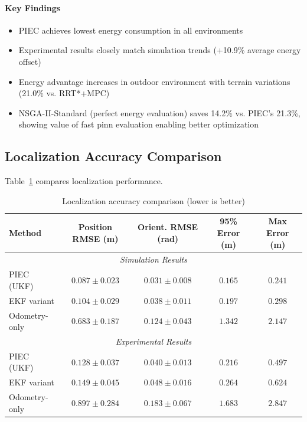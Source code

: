 
\paragraph{Key Findings}
\begin{itemize}
    \item PIEC achieves lowest energy consumption in all environments
    \item Experimental results closely match simulation trends (+10.9\% average energy offset)
    \item Energy advantage increases in outdoor environment with terrain variations (21.0\% vs. RRT*+MPC)
    \item NSGA-II-Standard (perfect energy evaluation) saves 14.2\% vs. PIEC's 21.3\%, showing value of fast \acrshort{pinn} evaluation enabling better optimization
\end{itemize}

\subsection{Localization Accuracy Comparison}

Table~\ref{tab:comparison_localization} compares localization performance.

\begin{table}[htbp]
\centering
\caption{Localization accuracy comparison (lower is better)}
\label{tab:comparison_localization}
\begin{tabular}{lcccc}
\toprule
\textbf{Method} & \textbf{Position RMSE (m)} & \textbf{Orient. RMSE (rad)} & \textbf{95\% Error (m)} & \textbf{Max Error (m)} \\
\midrule
\multicolumn{5}{c}{\textit{Simulation Results}} \\
\midrule
PIEC (UKF) & $\mathbf{0.087 \pm 0.023}$ & $\mathbf{0.031 \pm 0.008}$ & $\mathbf{0.165}$ & $\mathbf{0.241}$ \\
EKF variant & $0.104 \pm 0.029$ & $0.038 \pm 0.011$ & $0.197$ & $0.298$ \\
Odometry-only & $0.683 \pm 0.187$ & $0.124 \pm 0.043$ & $1.342$ & $2.147$ \\
\midrule
\multicolumn{5}{c}{\textit{Experimental Results}} \\
\midrule
PIEC (UKF) & $\mathbf{0.128 \pm 0.037}$ & $\mathbf{0.040 \pm 0.013}$ & $\mathbf{0.216}$ & $\mathbf{0.497}$ \\
EKF variant & $0.149 \pm 0.045$ & $0.048 \pm 0.016$ & $0.264$ & $0.624$ \\
Odometry-only & $0.897 \pm 0.284$ & $0.183 \pm 0.067$ & $1.683$ & $2.847$ \\
\bottomrule
\end{tabular}
\end{table}

